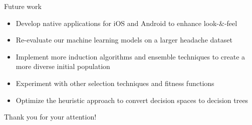 \documentclass[english]{beamer}
\begin{document}
\begin{frame}{Future work}
	\begin{itemize}
		\item Develop native applications for iOS and Android to enhance look-\&-feel
		\item Re-evaluate our machine learning models on a larger headache dataset
		\item Implement more induction algorithms and ensemble techniques to create a more diverse initial population
		\item Experiment with other selection techniques
		and fitness functions
		\item Optimize the heuristic approach to convert decision spaces to decision trees
	\end{itemize}
\end{frame}

{
\begin{frame}{Thank you for your attention!}
	\scriptsize{\tableofcontents[hidesubsections]}
\end{frame} }
\end{document}
